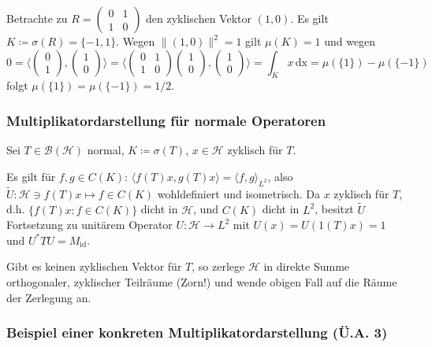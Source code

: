 \documentclass[11pt,a4paper]{scrartcl}
\newcommand{\Hc}{\mathcal{H}}
\newcommand{\B}{\mathcal{B}}
\theoremstyle{plain}
\theoremstyle{definition}
\theoremstyle{remark}
\begin{document}
Betrachte zu $R=\left(\begin{smallmatrix} 0 & 1 \\ 1 & 0 \end{smallmatrix}\right)$ den zyklischen Vektor $(1,0)$. Es gilt $K\coloneqq \sigma(R)=\{-1, 1\}$. Wegen $\|(1,0)\|^2=1$ gilt $\mu(K)=1$ und wegen $$0=\langle \left(\begin{smallmatrix} 0 \\ 1 \end{smallmatrix}\right), \left(\begin{smallmatrix} 1 \\ 0 \end{smallmatrix}\right) \rangle=\langle \left(\begin{smallmatrix} 0 & 1 \\ 1 & 0 \end{smallmatrix}\right)\left(\begin{smallmatrix} 1 \\ 0 \end{smallmatrix}\right), \left(\begin{smallmatrix} 1 \\ 0 \end{smallmatrix}\right) \rangle=\int_K x \, \mathrm{dx}=\mu(\{1\})-\mu(\{-1\})$$ folgt $\mu(\{1\})=\mu(\{-1\})=1/2$.


\subsubsection{Multiplikatordarstellung für normale Operatoren}

Sei $T\in \B(\Hc)$ normal, $K\coloneqq \sigma(T)$, $x\in \Hc$ zyklisch für $T$. 

Es gilt für $f,g\in C(K)$: $\langle f(T)x, g(T)x \rangle = \langle f,g\rangle_{L^2}$, also $\tilde U: \Hc\ni f(T)x \mapsto f \in C(K)$ wohldefiniert und isometrisch. Da $x$ zyklisch für $T$, d.h. $\{ f(T)x: f\in C(K) \}$ dicht in $\Hc$, und $C(K)$ dicht in $L^2$, besitzt $\tilde U$ Fortsetzung zu unitärem Operator $U: \Hc \to L^2$ mit $U(x)=U(1(T)x)=1$ und $U^*TU=M_\mathrm{id}$.

Gibt es keinen zyklischen Vektor für $T$, so zerlege $\Hc$ in direkte Summe orthogonaler, zyklischer Teilräume (Zorn!) und wende obigen Fall auf die Räume der Zerlegung an.

\subsubsection{Beispiel einer konkreten Multiplikatordarstellung (Ü.A. 3)}
\end{document}

